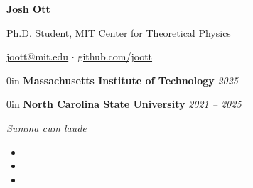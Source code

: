 \documentclass{cv}
\begin{document}
\begin{center}
    {\textbf{\LARGE Josh Ott}\par}

    \vspace{0.2em}

    Ph.D. Student, MIT Center for Theoretical Physics

    \href{mailto:joott@mit.edu}{joott@mit.edu} $\cdot$
    \href{https://www.github.com/joott}{github.com/joott}\\
\end{center}
\vspace{-0.6em}


\begin{adjustwidth}{\spacing}{0in}
    \textbf{Massachusetts Institute of Technology} \hfill \textsl{2025 --}

\end{adjustwidth}

\begin{adjustwidth}{\spacing}{0in}
    \textbf{North Carolina State University} \hfill \textsl{2021 -- 2025}


    \tabto{\bullet} \textit{Summa cum laude}
\end{adjustwidth}





\vspace{-0.6em}

\begin{itemize}[leftmargin=1.3em]
    \item {}
    \item {}
    \item {}
\end{itemize}
\vspace{-0.3em}

\end{document}
